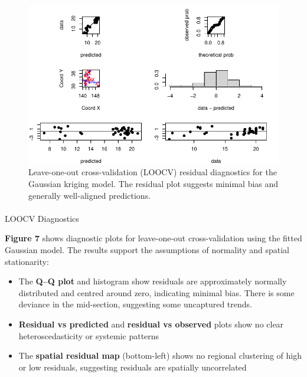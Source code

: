 \documentclass[
  11pt,
]{article}
\makeatletter
\let\oldparagraph\paragraph
\renewcommand{\paragraph}{
    \@ifstar
      \xxxParagraphStar
      \xxxParagraphNoStar
  }
\newcommand{\xxxParagraphStar}[1]{\oldparagraph*{#1}\mbox{}}
\newcommand{\xxxParagraphNoStar}[1]{\oldparagraph{#1}\mbox{}}
\makeatother
\begin{document}
\begin{figure}[H]

{\centering \includegraphics{project_files/figure-pdf/fig-cvkrig-1.pdf}

}

\caption{Leave-one-out cross-validation (LOOCV) residual diagnostics for
the Gaussian kriging model. The residual plot suggests minimal bias and
generally well-aligned predictions.}

\end{figure}%

\paragraph{LOOCV Diagnostics}\label{loocv-diagnostics}

\textbf{Figure 7} shows diagnostic plots for leave-one-out
cross-validation using the fitted Gaussian model. The results support
the assumptions of normality and spatial stationarity:

\begin{itemize}
\item
  The \textbf{Q--Q plot} and histogram show residuals are approximately
  normally distributed and centred around zero, indicating minimal bias.
  There is some deviance in the mid-section, suggesting some uncaptured
  trends.
\item
  \textbf{Residual vs predicted} and \textbf{residual vs observed} plots
  show no clear heteroscedasticity or systemic patterns
\item
  The \textbf{spatial residual map} (bottom-left) shows no regional
  clustering of high or low residuals, suggesting residuals are
  spatially uncorrelated
\end{itemize}
\end{document}
